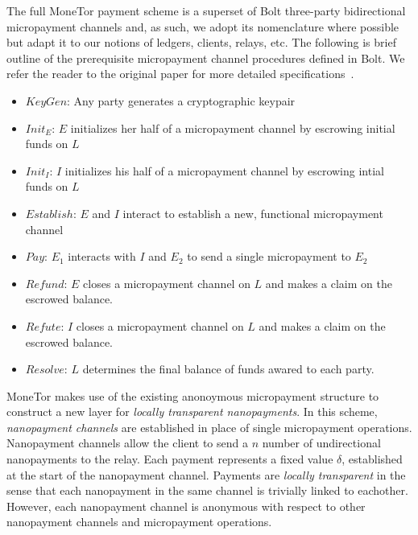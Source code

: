 The full MoneTor payment scheme is a superset of Bolt three-party bidirectional
micropayment channels and, as such, we adopt its nomenclature where possible but
adapt it to our notions of ledgers, clients, relays, etc. The following is brief
outline of the prerequisite micropayment channel procedures defined in Bolt. We
refer the reader to the original paper for more detailed
specifications~\cite{green2017bolt}.

\begin{itemize}
\item $KeyGen$: Any party generates a cryptographic keypair
\item $Init_E$: $E$ initializes her half of a micropayment channel by escrowing
  initial funds on $L$
\item $Init_I$: $I$ initializes his half of a micropayment channel by
  escrowing intial funds on $L$
\item $Establish$: $E$ and $I$ interact to establish a new, functional
  micropayment channel
\item $Pay$: $E_1$ interacts with $I$ and $E_2$ to send a single micropayment to $E_2$
\item $Refund$: $E$ closes a micropayment channel on $L$ and makes a claim on
  the escrowed balance.
\item $Refute$: $I$ closes a micropayment channel on $L$ and makes a claim on
  the escrowed balance.
\item $Resolve$: $L$ determines the final balance of funds awared to
  each party.
\end{itemize}

MoneTor makes use of the existing anonoymous micropayment structure to construct
a new layer for \emph{locally transparent nanopayments}. In this scheme,
\emph{nanopayment channels} are established in place of single micropayment
operations. 
Nanopayment channels allow the client to send a $n$ number of
undirectional nanopayments to the relay. Each payment represents a fixed value
$\delta$, established at the start of the nanopayment channel. Payments are
\emph{locally transparent} in the sense that each nanopayment in the same
channel is trivially linked to eachother. However, each nanopayment channel is
anonymous with respect to other nanopayment channels and micropayment
operations.

